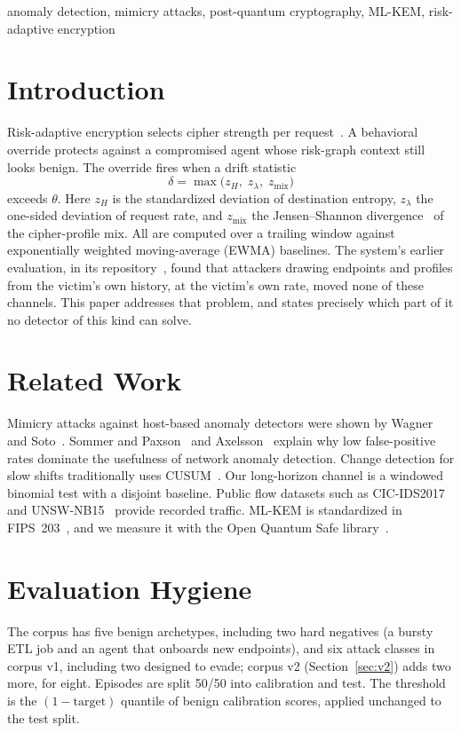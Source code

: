 \documentclass[conference]{IEEEtran}
\theoremstyle{remark}
\begin{document}
\begin{IEEEkeywords}
anomaly detection, mimicry attacks, post-quantum cryptography, ML-KEM, risk-adaptive encryption
\end{IEEEkeywords}

\section{Introduction}
Risk-adaptive encryption selects cipher strength per request~\cite{prior-cipher}. A behavioral override protects against a compromised agent whose risk-graph context still looks benign. The override fires when a drift statistic
\begin{equation}
\delta=\max\!\big(z_H,\;z_\lambda,\;z_{\mathrm{mix}}\big)\label{eq:delta}
\end{equation}
exceeds $\theta$. Here $z_H$ is the standardized deviation of destination entropy, $z_\lambda$ the one-sided deviation of request rate, and $z_{\mathrm{mix}}$ the Jensen--Shannon divergence~\cite{lin1991} of the cipher-profile mix. All are computed over a trailing window against exponentially weighted moving-average (EWMA) baselines. The system's earlier evaluation, in its repository~\cite{prior-cipher}, found that attackers drawing endpoints and profiles from the victim's own history, at the victim's own rate, moved none of these channels. This paper addresses that problem, and states precisely which part of it no detector of this kind can solve.

\section{Related Work}
Mimicry attacks against host-based anomaly detectors were shown by Wagner and Soto~\cite{wagner2002}. Sommer and Paxson~\cite{sommer2010} and Axelsson~\cite{axelsson2000} explain why low false-positive rates dominate the usefulness of network anomaly detection. Change detection for slow shifts traditionally uses CUSUM~\cite{page1954}. Our long-horizon channel is a windowed binomial test with a disjoint baseline. Public flow datasets such as CIC-IDS2017~\cite{sharafaldin2018} and UNSW-NB15~\cite{moustafa2015} provide recorded traffic. ML-KEM is standardized in FIPS~203~\cite{fips203}, and we measure it with the Open Quantum Safe library~\cite{stebila2016}.

\section{Evaluation Hygiene}\label{sec:hygiene}
The corpus has five benign archetypes, including two hard negatives (a bursty ETL job and an agent that onboards new endpoints), and six attack classes in corpus v1, including two designed to evade; corpus v2 (Section~\ref{sec:v2}) adds two more, for eight. Episodes are split 50/50 into calibration and test. The threshold is the $(1-\text{target})$ quantile of benign calibration scores, applied unchanged to the test split.
\end{document}
